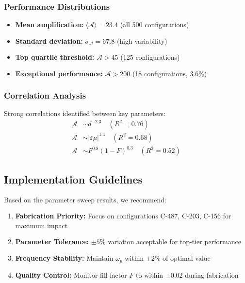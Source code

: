 \documentclass[11pt]{article}
\begin{document}
\subsubsection*{Performance Distributions}
\begin{itemize}
  \item \textbf{Mean amplification:} $\langle\mathcal{A}\rangle = 23.4$ (all 500 configurations)
  \item \textbf{Standard deviation:} $\sigma_{\mathcal{A}} = 67.8$ (high variability)
  \item \textbf{Top quartile threshold:} $\mathcal{A} > 45$ (125 configurations)
  \item \textbf{Exceptional performance:} $\mathcal{A} > 200$ (18 configurations, 3.6\%)
\end{itemize}

\subsubsection*{Correlation Analysis}
Strong correlations identified between key parameters:
\begin{align}
  \mathcal{A} &\sim d^{-2.3} \quad (R^2 = 0.76) \\
  \mathcal{A} &\sim |\varepsilon\mu|^{1.4} \quad (R^2 = 0.68) \\
  \mathcal{A} &\sim F^{0.8}(1-F)^{0.3} \quad (R^2 = 0.52)
\end{align}

\subsection*{Implementation Guidelines}
Based on the parameter sweep results, we recommend:
\begin{enumerate}
  \item \textbf{Fabrication Priority:} Focus on configurations C-487, C-203, C-156 for maximum impact
  \item \textbf{Parameter Tolerance:} $\pm 5\%$ variation acceptable for top-tier performance
  \item \textbf{Frequency Stability:} Maintain $\omega_p$ within $\pm 2\%$ of optimal value
  \item \textbf{Quality Control:} Monitor fill factor $F$ to within $\pm 0.02$ during fabrication
\end{enumerate}
\end{document}
